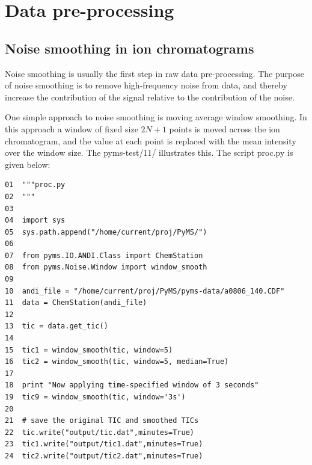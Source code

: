 

\chapter{Data pre-processing}

\section{Noise smoothing in ion chromatograms}


Noise smoothing is usually the first step in raw data pre-processing. The
purpose of noise smoothing is to remove high-frequency noise from data, and
thereby increase the contribution of the signal relative to the contribution
of the noise.

One simple approach to noise smoothing is moving average window smoothing.
In this approach a window of fixed size $2N+1$ points is moved across the ion
chromatogram, and the value at each point is replaced with the mean intensity
over the window size. The pyms-test/11/ illustrates this. The script proc.py
is given below:

\begin{verbatim}
01  """proc.py
02  """
03  
04  import sys
05  sys.path.append("/home/current/proj/PyMS/")
06  
07  from pyms.IO.ANDI.Class import ChemStation
08  from pyms.Noise.Window import window_smooth
09  
10  andi_file = "/home/current/proj/PyMS/pyms-data/a0806_140.CDF"
11  data = ChemStation(andi_file)
12  
13  tic = data.get_tic()
14  
15  tic1 = window_smooth(tic, window=5)
16  tic2 = window_smooth(tic, window=5, median=True)
17  
18  print "Now applying time-specified window of 3 seconds"
19  tic9 = window_smooth(tic, window='3s')
20  
21  # save the original TIC and smoothed TICs
22  tic.write("output/tic.dat",minutes=True)
23  tic1.write("output/tic1.dat",minutes=True)
24  tic2.write("output/tic2.dat",minutes=True)
\end{verbatim}

